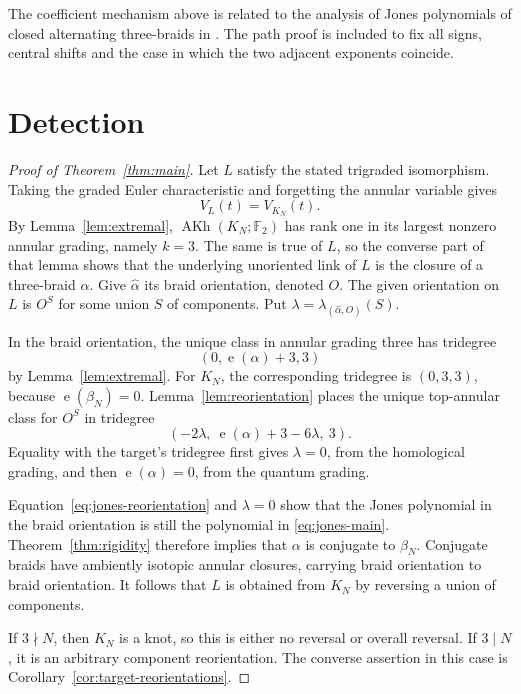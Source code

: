 \documentclass[10pt,a4paper]{amsart}
\newcommand{\F}{\mathbb F_2}
\newcommand{\AKh}{\operatorname{AKh}}
\newcommand{\e}{\operatorname{e}}
\begin{document}
The coefficient mechanism above is related to the analysis of Jones polynomials of
closed alternating three-braids in \cite{Chbili}.  The path proof is included to fix
all signs, central shifts and the case in which the two adjacent exponents coincide.

\section{Detection}


\begin{proof}[Proof of Theorem~\ref{thm:main}]
Let \(L\) satisfy the stated trigraded isomorphism.  Taking the graded Euler
characteristic and forgetting the annular variable gives
\begin{equation}\label{eq:jones-main}
  V_L(t)=V_{K_N}(t).
\end{equation}
By Lemma~\ref{lem:extremal}, \(\AKh(K_N;\F)\) has rank one in its largest nonzero
annular grading, namely \(k=3\).  The same is true of \(L\), so the converse part of
that lemma shows that the underlying unoriented link of \(L\) is the closure of a
three-braid \(\alpha\).  Give \(\widehat\alpha\) its braid orientation, denoted \(O\).
The given orientation on \(L\) is \(O^S\) for some union \(S\) of components.  Put
\(\lambda=\lambda_{(\widehat\alpha,O)}(S)\).

In the braid orientation, the unique class in annular grading three has tridegree
\[
  (0,\e(\alpha)+3,3)
\]
by Lemma~\ref{lem:extremal}.  For \(K_N\), the corresponding tridegree is
\((0,3,3)\), because \(\e(\beta_N)=0\).  Lemma~\ref{lem:reorientation} places the
unique top-annular class for \(O^S\) in tridegree
\[
  (-2\lambda,\ \e(\alpha)+3-6\lambda,\ 3).
\]
Equality with the target's tridegree first gives \(\lambda=0\), from the homological
grading, and then \(\e(\alpha)=0\), from the quantum grading.

Equation~\eqref{eq:jones-reorientation} and \(\lambda=0\) show that the Jones
polynomial in the braid orientation is still the polynomial in
\eqref{eq:jones-main}.  Theorem~\ref{thm:rigidity} therefore implies that \(\alpha\)
is conjugate to \(\beta_N\).  Conjugate braids have ambiently isotopic annular
closures, carrying braid orientation to braid orientation.  It follows that \(L\)
is obtained from \(K_N\) by reversing a union of components.

If \(3\nmid N\), then \(K_N\) is a knot, so this is either no reversal or overall
reversal.  If \(3\mid N\), it is an arbitrary component reorientation.  The converse
assertion in this case is Corollary~\ref{cor:target-reorientations}.
\end{proof}
\end{document}

